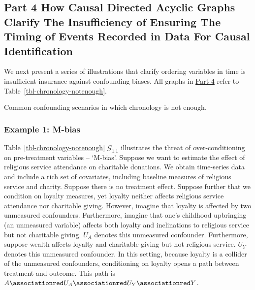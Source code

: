 \documentclass[
  single column]{article}
\begin{document}
\subsection{Part 4 How Causal Directed Acyclic Graphs Clarify The
Insufficiency of Ensuring The Timing of Events Recorded in Data For
Causal Identification}\label{id-sec-4}

We next present a series of illustrations that clarify ordering
variables in time is insufficient insurance against confounding biases.
All graphs in \hyperref[id-sec-4]{Part 4} refer to
Table~\ref{tbl-chronology-notenough}.

\begin{table}

\caption{\label{tbl-chronology-notenough}Common confounding scenarios in
which chronology is not enough.}

\centering{

\terminologychronologicalhygeineNOTENOUGH

}

\end{table}%

\subsubsection{Example 1: M-bias}\label{example-1-m-bias}

Table~\ref{tbl-chronology-notenough} \(\mathcal{G}_{1.1}\) illustrates
the threat of over-conditioning on pre-treatment variables -- `M-bias'.
Suppose we want to estimate the effect of religious service attendance
on charitable donations. We obtain time-series data and include a rich
set of covariates, including baseline measures of religious service and
charity. Suppose there is no treatment effect. Suppose further that we
condition on loyalty measures, yet loyalty neither affects religious
service attendance nor charitable giving. However, imagine that loyalty
is affected by two unmeasured confounders. Furthermore, imagine that
one's childhood upbringing (an unmeasured variable) affects both loyalty
and inclinations to religious service but not charitable giving. \(U_A\)
denotes this unmeasured confounder. Furthermore, suppose wealth affects
loyalty and charitable giving but not religious service. \(U_Y\) denotes
this unmeasured confounder. In this setting, because loyalty is a
collider of the unmeasured confounders, conditioning on loyalty opens a
path between treatment and outcome. This path is
\(A \associationred U_A \associationred U_Y \associationred Y\).
\end{document}
